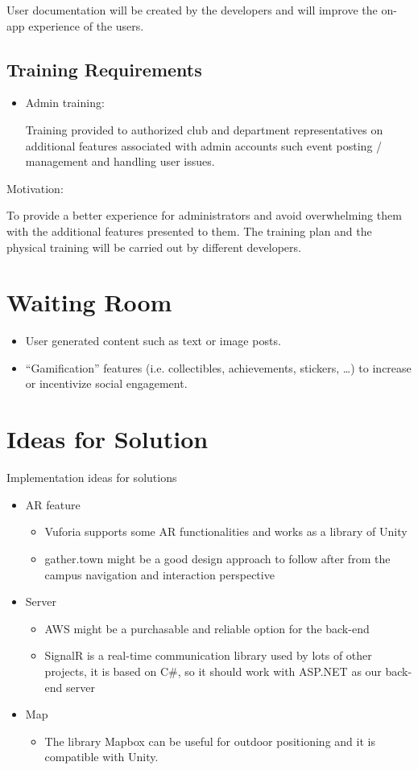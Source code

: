 \documentclass[12pt]{article}
\begin{document}
User documentation will be created by the developers and will improve the on-app experience of the users.


\subsection{Training Requirements}

\begin{itemize}
\item Admin training: 

Training provided to authorized club and department representatives on additional features associated with admin accounts such event posting / management and handling user issues.
\end{itemize}
Motivation: 

To provide a better experience for administrators and avoid overwhelming them with the additional features presented to them. The training plan and the physical training will be carried out by different developers.

\section{Waiting Room}
\begin{itemize}
  \item User generated content such as text or image posts.
  \item ``Gamification'' features (i.e. collectibles, achievements, stickers, \dots) to increase or incentivize social engagement.
\end{itemize}
\section{Ideas for Solution}
Implementation ideas for solutions
\begin{itemize}
\item AR feature
	\begin{itemize}
	\item Vuforia supports some AR functionalities and works as a library of Unity
	\item gather.town might be a good design approach to follow after from the campus navigation and interaction perspective
	\end{itemize}
\item Server
	\begin{itemize}
	\item AWS might be a purchasable and reliable option for the back-end
	\item SignalR is a real-time communication library used by lots of other projects, it is based on C\#, so it should work with ASP.NET as our back-end server
	\end{itemize}
\item Map
\begin{itemize}
	\item The library Mapbox can be useful for outdoor positioning and it is compatible with Unity.
	\end{itemize}
\end{itemize}
\end{document}

